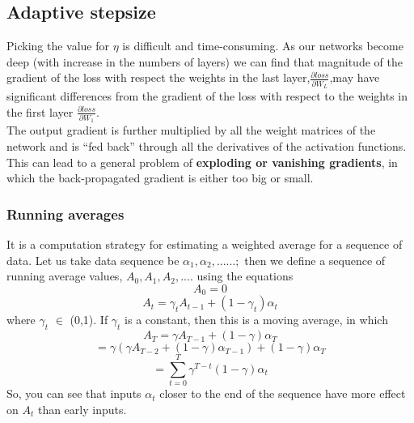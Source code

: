 \subsection{ Adaptive stepsize}

Picking the value for $\eta$ is difficult and time-consuming. As our networks become deep (with increase in the numbers of layers) we can find that magnitude of the gradient of the loss with respect the weights in the last layer,$\frac{\partial loss}{\partial W_L}$,may have significant differences from the gradient of the loss with respect to the weights in the first layer $\frac{\partial loss}{\partial W_1}$.\\

The output gradient is further multiplied by all the weight matrices of the network and is “fed
back” through all the derivatives of the activation functions. This can lead to a general problem
of \textbf{exploding or vanishing gradients}, in which the back-propagated gradient is either too big
or small.

\subsubsection{Running averages}


It is a computation strategy for estimating a weighted average for a sequence of data. Let us take data sequence be $\alpha_1, \alpha_2,......;$ then we define a sequence of running average values, $A_0, A_1, A_2,....$ using the equations
\begin{equation*}
      A_0 = 0
\end{equation*}
\begin{equation*}
         A_t = \gamma_t A_{t-1} + (1-\gamma_t)\alpha_t
\end{equation*}
where $\gamma_t$ $\in$ (0,1). If $\gamma_t$ is a constant, then this is a moving average, in which
\begin{equation*}
         A_T = \gamma A_{T-1} + (1-\gamma)\alpha_T
\end{equation*}
\begin{equation*}
       = \gamma(\gamma A_{T-2} +(1-\gamma)\alpha_{T-1}) +(1-\gamma)\alpha_T
\end{equation*}
\begin{equation*}
     = \sum_{t=0} ^T \gamma^{T-t}(1-\gamma)\alpha_t
\end{equation*}
So, you can see that inputs $\alpha_t$ closer to the end of the sequence have more effect on $A_t$ than early inputs.\\


